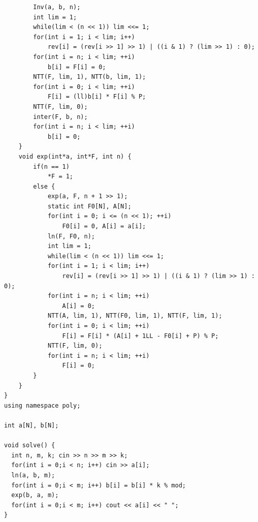 \documentclass[twoside]{article}
\begin{document}
\begin{lstlisting}
        Inv(a, b, n);
        int lim = 1;
        while(lim < (n << 1)) lim <<= 1;
        for(int i = 1; i < lim; i++)
            rev[i] = (rev[i >> 1] >> 1) | ((i & 1) ? (lim >> 1) : 0);
        for(int i = n; i < lim; ++i)
            b[i] = F[i] = 0;
        NTT(F, lim, 1), NTT(b, lim, 1);
        for(int i = 0; i < lim; ++i)
            F[i] = (ll)b[i] * F[i] % P;
        NTT(F, lim, 0);
        inter(F, b, n);
        for(int i = n; i < lim; ++i)
            b[i] = 0;
    }
    void exp(int*a, int*F, int n) {
        if(n == 1)
            *F = 1;
        else {
            exp(a, F, n + 1 >> 1);
            static int F0[N], A[N];
            for(int i = 0; i <= (n << 1); ++i)
                F0[i] = 0, A[i] = a[i];
            ln(F, F0, n);
            int lim = 1;
            while(lim < (n << 1)) lim <<= 1;
            for(int i = 1; i < lim; i++)
                rev[i] = (rev[i >> 1] >> 1) | ((i & 1) ? (lim >> 1) : 0);
            for(int i = n; i < lim; ++i)
                A[i] = 0;
            NTT(A, lim, 1), NTT(F0, lim, 1), NTT(F, lim, 1);
            for(int i = 0; i < lim; ++i)
                F[i] = F[i] * (A[i] + 1LL - F0[i] + P) % P;
            NTT(F, lim, 0);
            for(int i = n; i < lim; ++i)
                F[i] = 0;
        }
    }
}
using namespace poly;

int a[N], b[N];

void solve() {
  int n, m, k; cin >> n >> m >> k;
  for(int i = 0;i < n; i++) cin >> a[i];
  ln(a, b, m);
  for(int i = 0;i < m; i++) b[i] = b[i] * k % mod;
  exp(b, a, m);
  for(int i = 0;i < m; i++) cout << a[i] << " ";
}
\end{lstlisting}
\end{document}
